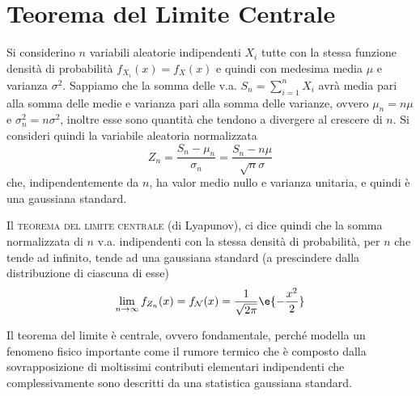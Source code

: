 \section{Teorema del Limite Centrale}
Si considerino $n$ variabili aleatorie indipendenti $X_i$ tutte con la stessa funzione densità di probabilità $f_{X_i}(x)=f_X(x)$ e quindi con medesima media $\mu$ e varianza $\sigma^2$. Sappiamo che la somma delle v.a. $S_n=\sum_{i=1}^{n}X_i$ avrà media pari alla somma delle medie e varianza pari alla somma delle varianze, ovvero $\mu_n=n\mu$ e $\sigma^2_n=n\sigma^2$, inoltre esse sono quantità che tendono a divergere al crescere di $n$.
Si consideri quindi la variabile aleatoria normalizzata
\[
	Z_n=\frac{S_n-\mu_n}{\sigma_n}=\frac{S_n-n\mu}{\sqrt{n}\sigma}
\]
che, indipendentemente da $n$, ha valor medio nullo e varianza unitaria, e quindi è una gaussiana standard.

Il \textsc{teorema del limite centrale} (di Lyapunov), ci dice quindi che la somma normalizzata di $n$ v.a. indipendenti con la stessa densità di probabilità, per $n$ che tende ad infinito, tende ad una gaussiana standard (a prescindere dalla distribuzione di ciascuna di esse)
\begin{equation}
	\lim\limits_{n\to\infty}f_{Z_n}(x)=f_\mathcal{N}(x)=\frac{1}{\sqrt{2\pi}}\e{-\frac{x^2}{2}}
\end{equation}
\begin{nota}
	Il teorema del limite è centrale, ovvero fondamentale, perché modella un fenomeno fisico importante come il rumore termico che è composto dalla sovrapposizione di moltissimi contributi elementari indipendenti che complessivamente sono descritti da una statistica gaussiana standard.
\end{nota}
